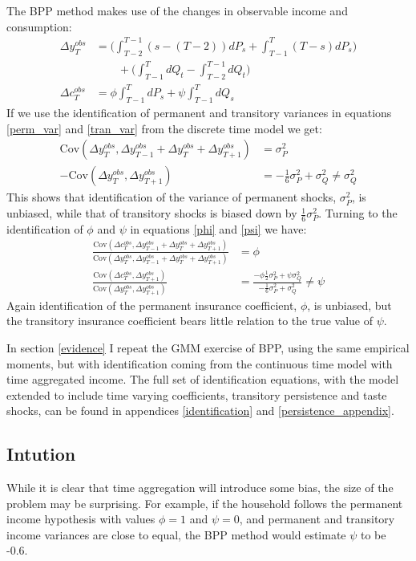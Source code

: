 \documentclass[AER]{AEA}
\begin{document}
The BPP method makes use of the changes in observable income and consumption:
\begin{align}
\Delta y^{obs}_T &=  \Big(\int_{T-2}^{T-1} (s-(T-2))dP_s  + \int_{T-1}^{T} (T-s)dP_s \Big) \nonumber \\
& \qquad + \Big(\int_{T-1}^{T} dQ_t -\int_{T-2}^{T-1} dQ_t \Big) \label{deltay} \\
\Delta c^{obs}_T &= \phi  \int_{T-1}^{T} dP_s  +\psi \int_{T-1}^{T}dQ_s  \label{deltac}
\end{align}
If we use the identification of permanent and transitory variances in equations \ref{perm_var} and \ref{tran_var} from the discrete time model we get:
\begin{align*}
\mathrm{Cov}(\Delta y^{obs}_{T}, \Delta y^{obs}_{T-1}+\Delta y^{obs}_{T}+\Delta y^{obs}_{T+1}) &= \sigma^2_P\\
-\mathrm{Cov}(\Delta y^{obs}_{T},\Delta y^{obs}_{T+1}) &= -\frac{1}{6}\sigma^2_P + \sigma^2_Q \neq \sigma^2_Q
\end{align*}
This shows that identification of the variance of permanent shocks, $\sigma^2_P$, is unbiased, while that of transitory shocks is biased down by $\frac{1}{6}\sigma^2_P$. Turning to the identification of $\phi$ and $\psi$ in equations \ref{phi} and \ref{psi} we have:
\begin{align}
\frac{\mathrm{Cov}(\Delta c^{obs}_{T}, \Delta y^{obs}_{T-1}+\Delta y^{obs}_{T}+\Delta y^{obs}_{T+1})}{\mathrm{Cov}(\Delta y^{obs}_{T}, \Delta y^{obs}_{T-1}+\Delta y^{obs}_{T}+\Delta y^{obs}_{T+1})}&= \phi\\
\frac{\mathrm{Cov}(\Delta c^{obs}_{T},\Delta y^{obs}_{T+1})}{\mathrm{Cov}(\Delta y^{obs}_{T},\Delta y^{obs}_{T+1})} &= \frac{-\phi\frac{1}{2}\sigma^2_P + \psi\sigma^2_Q}{-\frac{1}{6}\sigma^2_P + \sigma^2_Q} \neq \psi \label{not_psi}
\end{align}
Again identification of the permanent insurance coefficient, $\phi$, is unbiased, but the transitory insurance coefficient bears little relation to the true value of $\psi$. 

In section \ref{evidence} I repeat the GMM exercise of BPP, using the same empirical moments, but with identification coming from the continuous time model with time aggregated income. The full set of identification equations, with the model extended to include time varying coefficients, transitory persistence and taste shocks, can be found in appendices \ref{identification} and \ref{persistence_appendix}.

\subsection{Intution} \label{intuition}
While it is clear that time aggregation will introduce some bias, the size of the problem may be surprising. For example, if the household follows the permanent income hypothesis with values $\phi=1$ and $\psi=0$, and permanent and transitory income variances are close to equal, the BPP method would estimate $\psi$ to be -0.6. 
\end{document}

